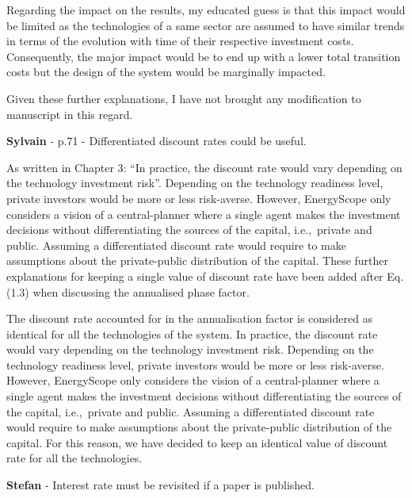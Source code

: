 \documentclass[12pt,a4paper]{article}
\def\ie{i.e.,\ }
\begin{document}
Regarding the impact on the results, my educated guess is that this impact would be limited as the technologies of a same sector are assumed to have similar trends in terms of the evolution with time of their respective investment costs. Consequently, the major impact would be to end up with a lower total transition costs but the design of the system would be marginally impacted.

Given these further explanations, I have not brought any modification to manuscript in this regard.

\begin{mdframed}[style=comment] %
{\color{purple} \textbf{Sylvain}} - p.71 - Differentiated discount rates could be useful.
\end{mdframed}

\noindent As written in Chapter 3: ``In practice, the discount rate would vary depending on the technology investment risk''. Depending on the technology readiness level, private investors would be more or less risk-averse. However, EnergyScope only considers a vision of a central-planner where a single agent makes the investment decisions without differentiating the sources of the capital, \ie private and public. Assuming a differentiated discount rate would require to make assumptions about the private-public distribution of the capital. These further explanations for keeping a single value of discount rate have been added {\color{blue} after Eq. (1.3) when discussing the annualised phase factor}.

\begin{mdframed}[style=manuscript] %
The discount rate accounted for in the annualisation factor is considered as identical for all the technologies of the system. In practice, the discount rate would vary depending on the technology investment risk. Depending on the technology readiness level, private investors would be more or less risk-averse. However, EnergyScope only considers the vision of a central-planner where a single agent makes the investment decisions without differentiating the sources of the capital, \ie private and public. Assuming a differentiated discount rate would require to make assumptions about the private-public distribution of the capital. For this reason, we have decided to keep an identical value of discount rate for all the technologies.
\end{mdframed}

\begin{mdframed}[style=comment] %
{\color{teal} \textbf{Stefan}} - Interest rate must be revisited if a paper is published.
\end{mdframed}
\end{document}
